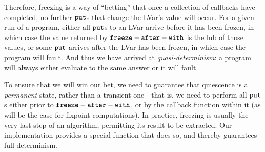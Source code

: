 Therefore, freezing is a way of ``betting'' that once a collection of callbacks
have completed, no further $\mbox{\texttt{put}}$s that change the LVar's value will occur.  For
a given run of a program, either all $\mbox{\texttt{put}}$s to an LVar arrive before it has
been frozen, in which case the value returned by ${\mbox{\texttt{freeze}}-\mbox{\texttt{after}}-\mbox{\texttt{with}}}$ is the lub of those
values, or some $\mbox{\texttt{put}}$ arrives after the LVar has been frozen, in which case the
program will fault.  And thus we have arrived at \emph{quasi-determinism}: a
program will always either evaluate to the same answer or it will fault.

To ensure that we will win our bet, we need to guarantee that quiescence is a
\emph{permanent} state, rather than a transient one---that is, we need to
perform all $\mbox{\texttt{put}}$s either prior to ${\mbox{\texttt{freeze}}-\mbox{\texttt{after}}-\mbox{\texttt{with}}}$, or by the callback function within it
(as will be the case for fixpoint computations).  In practice, freezing is
usually the very last step of an algorithm, permitting its result to be
extracted. Our implementation provides a special 
function that does so, and thereby guarantees full determinism.









